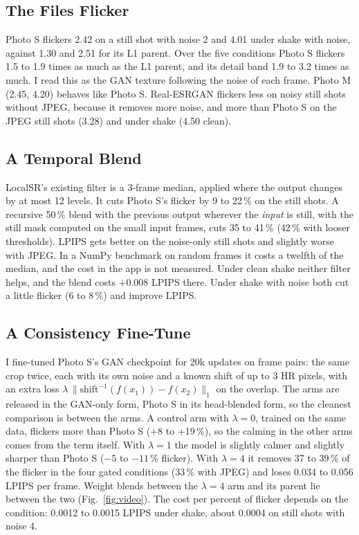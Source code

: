 \documentclass[conference]{IEEEtran}
\begin{document}
\subsection{The Files Flicker}
Photo S flickers 2.42 on a still shot with noise 2 and 4.01 under shake with noise, against 1.30 and 2.51 for its L1
parent. Over the five conditions Photo S flickers 1.5 to 1.9 times as much as the L1 parent, and its detail band 1.9 to
3.2 times as much. I read this as the GAN texture following the noise of each frame. Photo M (2.45, 4.20) behaves like
Photo S. Real-ESRGAN flickers less on noisy still shots without JPEG, because it removes more noise, and more than Photo S
on the JPEG still shots (3.28) and under shake (4.50 clean).

\subsection{A Temporal Blend}
LocalSR's existing filter is a 3-frame median, applied where the output changes by at most 12 levels. It cuts Photo S's
flicker by 9 to 22\,\% on the still shots. A recursive 50\,\% blend with the previous output wherever the \emph{input}
is still, with the still mask computed on the small input frames, cuts 35 to 41\,\% (42\,\% with looser thresholds).
LPIPS gets better on the noise-only still shots and slightly worse with JPEG. In a NumPy benchmark on random frames it
costs a twelfth of the median, and the cost in the app is not measured. Under clean shake neither filter helps, and the
blend costs $+0.008$ LPIPS there. Under shake with noise both cut a little flicker (6 to 8\,\%) and improve LPIPS.

\subsection{A Consistency Fine-Tune}
I fine-tuned Photo S's GAN checkpoint for 20k updates on frame pairs: the same crop twice, each with its own noise and
a known shift of up to 3 HR pixels, with an extra loss $\lambda\,\lVert \mathrm{shift}^{-1}(f(x_1)) - f(x_2)\rVert_1$
on the overlap. The arms are released in the GAN-only form, Photo S in its head-blended form, so the cleanest comparison
is between the arms. A control arm with $\lambda=0$, trained on the same data, flickers more than Photo S (+8 to
+19\,\%), so the calming in the other arms comes from the term itself. With $\lambda=1$ the model is slightly calmer
and slightly sharper than Photo S ($-5$ to $-11$\,\% flicker). With $\lambda=4$ it removes 37 to 39\,\% of the flicker in
the four gated conditions (33\,\% with JPEG) and loses 0.034 to 0.056 LPIPS per frame. Weight blends between the
$\lambda=4$ arm and its parent lie between the two (Fig.~\ref{fig:video}). The cost per percent of flicker depends on
the condition: 0.0012 to 0.0015 LPIPS under shake, about 0.0004 on still shots with noise 4.
\end{document}
